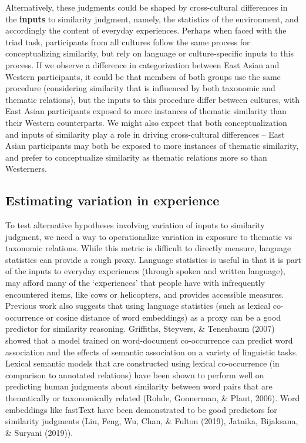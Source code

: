 \documentclass[10pt, letterpaper]{article}
\begin{document}
Alternatively, these judgments could be shaped by cross-cultural
differences in the \textbf{inputs} to similarity judgment, namely, the
statistics of the environment, and accordingly the content of everyday
experiences. Perhaps when faced with the triad task, participants from
all cultures follow the same process for conceptualizing similarity, but
rely on language or culture-specific inputs to this process. If we
observe a difference in categorization between East Asian and Western
participants, it could be that members of both groups use the same
procedure (considering similarity that is influenced by both taxonomic
and thematic relations), but the inputs to this procedure differ between
cultures, with East Asian participants exposed to more instances of
thematic similarity than their Western counterparts. We might also
expect that both conceptualization and inputs of similarity play a role
in driving cross-cultural differences -- East Asian participants may
both be exposed to more instances of thematic similarity, and prefer to
conceptualize similarity as thematic relations more so than Westerners.

\hypertarget{estimating-variation-in-experience}{%
\subsection{Estimating variation in
experience}\label{estimating-variation-in-experience}}

To test alternative hypotheses involving variation of inputs to
similarity judgment, we need a way to operationalize variation in
exposure to thematic vs taxonomic relations. While this metric is
difficult to directly measure, language statistics can provide a rough
proxy. Language statistics is useful in that it is part of the inputs to
everyday experiences (through spoken and written language), may afford
many of the `experiences' that people have with infrequently encountered
items, like cows or helicopters, and provides accessible measures.
Previous work also suggests that using language statistics (such as
lexical co-occurrence or cosine distance of word embeddings) as a proxy
can be a good predictor for similarity reasoning. Griffiths, Steyvers,
\& Tenenbaum (2007) showed that a model trained on word-document
co-occurrence can predict word association and the effects of semantic
association on a variety of linguistic tasks. Lexical semantic models
that are constructed using lexical co-occurrence (in comparison to
annotated relations) have been shown to perform well on predicting human
judgments about similarity between word pairs that are thematically or
taxonomically related (Rohde, Gonnerman, \& Plaut, 2006). Word
embeddings like fastText have been demonstrated to be good predictors
for similarity judgments (Liu, Feng, Wu, Chan, \& Fulton (2019),
Jatnika, Bijaksana, \& Suryani (2019)).
\end{document}

